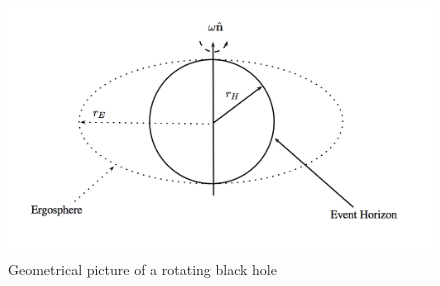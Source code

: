 \begin{figure}
\includegraphics{Draw/kerrBH.png}
\caption{Geometrical picture of a rotating black hole}
\label{kerrBH}
\end{figure} 

